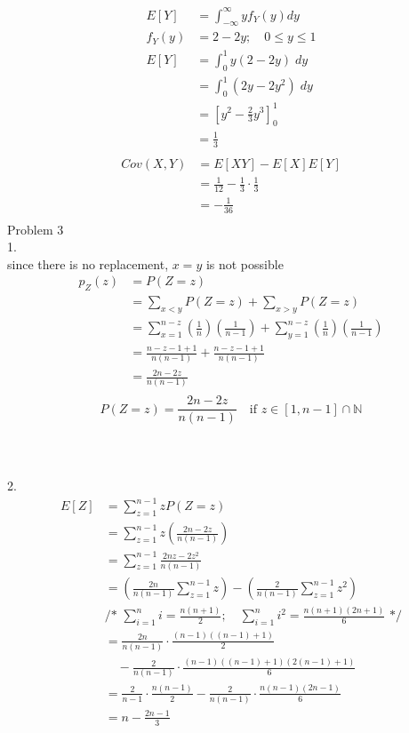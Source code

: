 \documentclass[12pt,border=4pt,multi]{article} %
\begin{document}
\begin{align*}
E[Y] &= \int_{-\infty}^{\infty} y f_Y(y) dy\\
f_Y(y) &= 2 - 2y;\quad 0 \leq y \leq 1\\
E[Y] &= \int_{0}^{1} y(2 - 2y)\;dy\\
&= \int_{0}^{1} (2y - 2y^2)\;dy\\
&= \left[y^2 - \frac{2}{3}y^3\right]_0^1\\
&= \frac{1}{3}\\
\end{align*}
\begin{align*}
Cov(X, Y) &= E[XY] - E[X]E[Y]\\
&= \frac{1}{12} - \frac{1}{3} \cdot \frac{1}{3}\\
&= \boxed{-\frac{1}{36}}\\
\end{align*}
\newpage
\noindent
Problem 3\\
1.\\
since there is no replacement, $x = y$ is not possible
\begin{align*}
p_Z(z) &= P(Z = z)\\
&= \sum_{x < y} P(Z = z) + \sum_{x > y} P(Z = z)\\
&= \sum_{x = 1}^{n - z} \left(\frac{1}{n}\right)\left(\frac{1}{n - 1}\right)
+ \sum_{y = 1}^{n - z} \left(\frac{1}{n}\right)\left(\frac{1}{n - 1}\right)\\
&= \frac{n - z - 1 + 1}{n(n - 1)} + \frac{n - z - 1 + 1}{n(n - 1)}\\
&= \frac{2n - 2z}{n(n - 1)}\\
\end{align*}
\[\boxed{P(Z = z) = \frac{2n - 2z}{n(n - 1)} \quad \text{if } z \in [1, n - 1] \cap \mathbb{N}}\]
\\
\\
\\
2.
\begin{align*}
E[Z] &= \sum_{z = 1}^{n - 1} z P(Z = z)\\
&= \sum_{z = 1}^{n - 1} z \left(\frac{2n - 2z}{n(n - 1)}\right)\\
&= \sum_{z = 1}^{n - 1} \frac{2nz - 2z^2}{n(n - 1)}\\
&= \left(\frac{2n}{n(n - 1)} \sum_{z = 1}^{n - 1} z\right) - \left(\frac{2}{n(n - 1)} \sum_{z = 1}^{n - 1} z^2\right)\\
&\text{/* } \sum_{i = 1}^n i = \frac{n(n + 1)}{2};\quad \sum_{i = 1}^n i^2 = \frac{n(n + 1)(2n + 1)}{6}\text{ */}\\
&= \frac{2n}{n(n - 1)} \cdot \frac{(n - 1)((n - 1) + 1)}{2}\\
&\quad- \frac{2}{n(n - 1)} \cdot \frac{(n - 1)((n - 1) + 1)(2(n - 1) + 1)}{6}\\
&= \frac{2}{n - 1} \cdot \frac{n(n - 1)}{2} - \frac{2}{n(n - 1)} \cdot \frac{n(n - 1)(2n - 1)}{6}\\
&= \boxed{n - \frac{2n - 1}{3}}\\
\end{align*}
\end{document}
